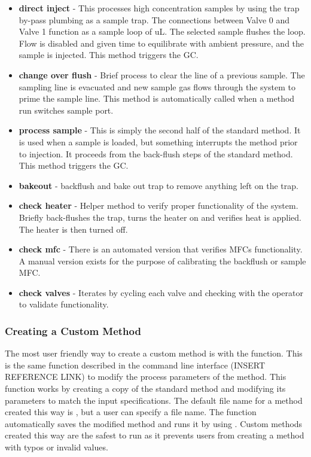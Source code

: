 \begin{itemize}
    \item \textbf{direct inject} - This processes high concentration samples by using the trap by-pass plumbing as a sample trap. The connections between Valve 0 and Valve 1 function as a sample loop of  uL. The selected sample flushes the loop. Flow is disabled and given time to equilibrate with ambient pressure, and the sample is injected. This method triggers the GC.
    \item \textbf{change over flush} - Brief process to clear the line of a previous sample. The sampling line is evacuated and new sample gas flows through the system to prime the sample line. This method is automatically called when a method run switches sample port.
    \item \textbf{process sample} - This is simply the second half of the standard method. It is used when a sample is loaded, but something interrupts the method prior to injection. It proceeds from the back-flush steps of the standard method. This method triggers the GC.
    \item \textbf{bakeout} - backflush and bake out trap to remove anything left on the trap.
    \item \textbf{check heater} - Helper method to verify proper functionality of the system. Briefly back-flushes the trap, turns the heater on and verifies heat is applied. The heater is then turned off.
    \item \textbf{check mfc} - There is an automated version that verifies MFCs functionality. A manual version exists for the purpose of calibrating the backflush or sample MFC.
    \item \textbf{check valves} - Iterates by cycling each valve and checking with the operator to validate functionality.
\end{itemize}

\subsubsection{Creating a Custom Method}

The most user friendly way to create a custom method is with the  function. This is the same function described in the command line interface (INSERT REFERENCE LINK) to modify the process parameters of the  method. This function works by creating a copy of the standard method and modifying its parameters to match the input specifications. The default file name for a method created this way is , but a user can specify a file name. The function automatically saves the modified method and runs it by using . Custom methods created this way are the safest to run as it prevents users from creating a method with typos or invalid values. 


